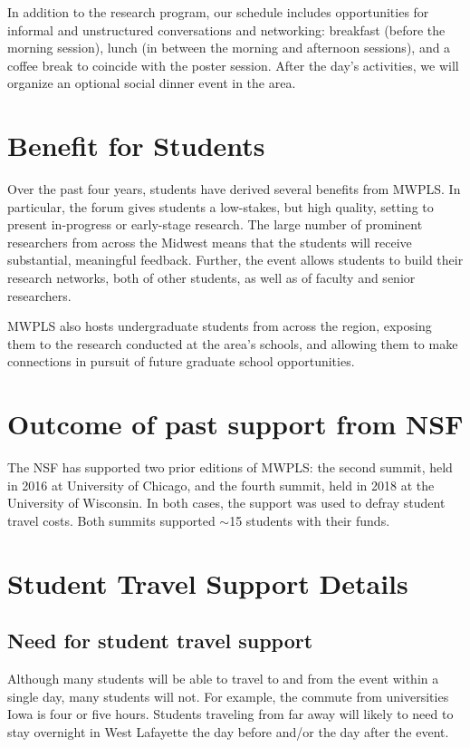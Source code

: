 \documentclass[11pt]{article}
\begin{document}
In addition to the research program, our schedule includes
opportunities for informal and unstructured conversations and
networking: breakfast (before the morning session), lunch (in between
the morning and afternoon sessions), and a coffee break to coincide
with the poster session. After the day's activities, we will organize
an optional social dinner event in the area.

\section{Benefit for Students}

Over the past four years, students have derived several benefits from MWPLS. In particular, the forum gives students a low-stakes, but high quality, setting to present in-progress or early-stage research. The large number of prominent researchers from across the Midwest means that the students will receive substantial, meaningful feedback. Further, the event allows students to build their research networks, both of other students, as well as of faculty and senior researchers.

MWPLS also hosts undergraduate students from across the region, exposing them to the research conducted at the area's schools, and allowing them to make connections in pursuit of future graduate school opportunities.

\section{Outcome of past support from NSF}

The NSF has supported two prior editions of MWPLS: the second summit, held in 2016 at University of Chicago, and the fourth summit, held in 2018 at the University of Wisconsin. In both cases, the support was used to defray student travel costs. Both summits supported $\sim$15 students with their funds.

\section{Student Travel Support Details}

\subsection{Need for student travel support}

Although many students will be able to travel to and from the event
within a single day, many 
students will not. For example, the commute from universities 
Iowa is four or five hours. Students traveling from far away will
likely to need to stay overnight in West Lafayette the day before and/or the
day after the event.
\end{document}
